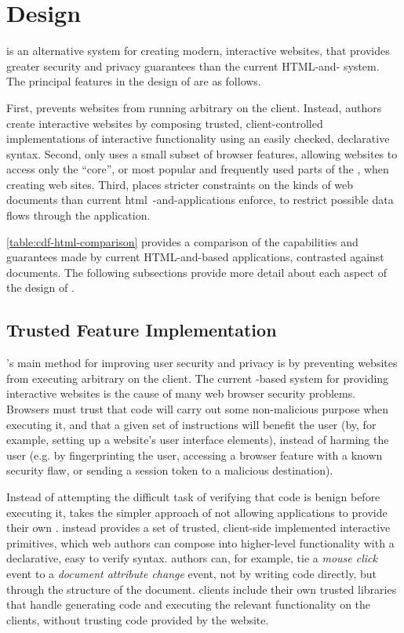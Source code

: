 \section{Design}
\label{future-web:design}

\CDF is an alternative system for creating modern, interactive websites, that
provides greater security and privacy guarantees than the current HTML-and-\JS
system.  The principal features in the design of \CDF are as follows.

First, \CDF prevents websites from running arbitrary \JS on the
client.  Instead, \CDF authors create interactive websites by composing
trusted, client-controlled implementations of interactive functionality using
an easily checked, declarative syntax.  Second, \CDF only uses a small
subset of browser features, allowing websites to access only the ``core'', or
most popular and frequently used parts of the \WAPI, when creating web sites.
Third, \CDF places stricter constraints on the kinds of web documents
than current \gls{html}~-and-\JS applications enforce, to restrict possible data
flows through the application.



\ref{table:cdf-html-comparison} provides a comparison of the capabilities
and guarantees made by current HTML-and-\JS based applications, contrasted
against \CDF documents.  The following subsections provide more detail
about each aspect of the design of \CDF.


\subsection{Trusted Feature Implementation}
\label{future-web:design:trusted-feature-implementation}
\CDF's main method for improving user security and privacy is by preventing
websites from executing arbitrary \JS on the client.  The current \JS-based
system for providing interactive websites is the cause of many web browser
security problems.  Browsers must trust that code will carry out some
non-malicious purpose when executing it, and that a given set of \JS
instructions will benefit the user (by, for example, setting up a website's
user interface elements), instead of harming the user (e.g. by fingerprinting
the user, accessing a browser feature with a known security flaw, or sending a
session token to a malicious destination).

Instead of attempting the difficult task of verifying that \JS code is benign
before executing it, \CDF takes the simpler approach of not allowing
applications to provide their own \JS.  \CDF instead provides a set of trusted,
client-side implemented interactive primitives, which web authors can compose
into higher-level functionality with a declarative, easy to verify syntax.
\CDF authors can, for example, tie a \emph{mouse click} event to a
\emph{document attribute change} event, not by writing code directly, but
through the structure of the document.  \CDF clients include their own trusted
libraries that handle generating code and executing the relevant functionality
on the clients, without trusting code provided by the website.

